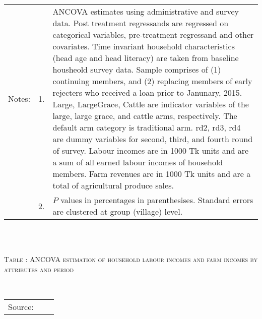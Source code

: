 \begin{minipage}[t]{14cm}
\begin{tabular}{>{\hfill\scriptsize}p{1cm}<{}>{\hfill\scriptsize}p{.25cm}<{}>{\scriptsize}p{12cm}<{\hfill}}
Notes: & 1. & ANCOVA estimates using administrative and survey data. Post treatment regressands are regressed on categorical variables, pre-treatment regressand and other covariates. Time invariant household characteristics (head age and head literacy) are taken from baseline housheold survey data. Sample comprises of (1) continuing members, and (2) replacing members of early rejecters who received a loan prior to Janunary, 2015.  \textsf{Large}, \textsf{LargeGrace}, \textsf{Cattle} are indicator variables of the \textsf{large}, \textsf{large grace}, and \textsf{cattle} arms, respectively. The default arm category is \textsf{traditional} arm. \textsf{rd2, rd3, rd4} are dummy variables for second, third, and fourth round of survey. Labour incomes are in 1000 Tk units and are a sum of all earned labour incomes of household members. Farm revenues are in 1000 Tk units and are a total of agricultural produce sales. \\
& 2. & $P$ values in percentages in parenthesises. Standard errors are clustered at group (village) level. %
 \end{tabular}
\end{minipage} \\\\\hspace{-1cm}\begin{minipage}[t]{14cm} \hfil\textsc{\normalsize Table \thetable: ANCOVA estimation of household labour incomes and farm incomes by attributes and period\label{tab ANCOVA labour incomes timevarying attributes}}\\ \setlength{\tabcolsep}{1pt}
  \setlength{\baselineskip}{8pt}
  \renewcommand{\arraystretch}{.55}
  \hfil{}\\
\renewcommand{\arraystretch}{.8}
\setlength{\tabcolsep}{1pt} \begin{tabular}{>{\hfill\scriptsize}p{1cm}<{}>{\hfill\scriptsize}p{.25cm}<{}>{\scriptsize}p{12cm}<{\hfill}} 
Source:& \multicolumn{2}{l}{\scriptsize Estimated with GUK administrative and survey data.}\\

\end{tabular}
\end{minipage}

